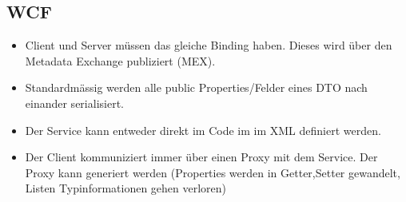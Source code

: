 \documentclass[
a4paper,
oneside,
10pt,
fleqn,
headsepline,
toc=listofnumbered, 
bibliography=totocnumbered]{scrartcl}
\begin{document}
\subsection{WCF}
\begin{itemize}
	\item Client und Server müssen das gleiche Binding haben. Dieses wird über den Metadata Exchange publiziert (MEX).
	\item Standardmässig werden alle public Properties/Felder eines DTO nach einander serialisiert.
	\item Der Service kann entweder direkt im Code im im XML definiert werden.
	\item Der Client kommuniziert immer über einen Proxy mit dem Service. Der Proxy kann generiert werden (Properties werden in Getter,Setter gewandelt, Listen Typinformationen gehen verloren)
\end{itemize}
\end{document}
